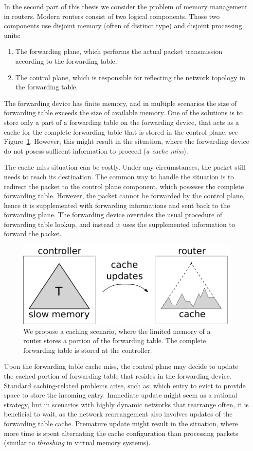 In the second part of this thesis we consider the problem of memory management in routers.
Modern routers consist of two logical components. Those two components use disjoint memory (often of distinct type) and disjoint processing units:
\begin{enumerate}
  \item The forwarding plane, which performs the actual packet transmission according to the forwarding table,
  \item The control plane, which is responsible for reflecting the network topology in the forwarding table.
\end{enumerate}

The forwarding device has finite memory, and in multiple scenarios the size of forwarding table exceeds the size of available memory.
One of the solutions is to store only a part of a forwarding table on the forwarding device, that acts as a cache for the complete forwarding table that is stored in the control plane, see Figure~\ref{fig:router}.
However, this might result in the situation, where the forwarding device do not posess sufficent information to proceed (\emph{a cache miss}).

The cache miss situation can be costly.
Under any circumstances, the packet still needs to reach its destination.
The common way to handle the situation is to redirect the packet to the control plane component, which posseses the complete forwarding table.
However, the packet cannot be forwarded by the control plane, hence it is supplemented with forwarding informations and sent back to the forwarding plane.
The forwarding device overrides the usual procedure of forwarding table lookup, and instead it uses the supplemented information to forward the packet.


\begin{figure}[h]
\centering
\includegraphics[width=0.39\columnwidth]{figs/router2.pdf}
\caption{We propose a caching scenario, where the limited memory of a router stores a portion of the forwarding table. The complete forwarding table is stored at the controller.}\label{fig:router}
\vspace{-1em}
\end{figure}




Upon the forwarding table cache miss, the control plane may decide to update the cached portion of forwarding table that resides in the forwarding device.
Standard caching-related problems arise, such as: which entry to evict to provide space to store the incoming entry.
Immediate update might seem as a rational strategy, but in scenarios with highly dynamic networks that rearrange often, it is beneficial to wait, as the network rearrangement also involves updates of the forwarding table cache.
Premature update might result in the situation, where more time is spent alternating the cache configuration than processing packets (similar to \emph{thrashing} in virtual memory systems).

